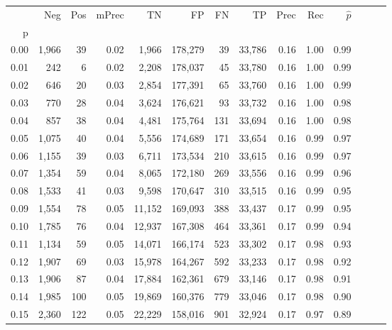 \begin{tabular}{rrrrrrrrrrrrrr}
\toprule
{} &    Neg &  Pos & mPrec &       TN &       FP &      FN &      TP &  Prec &   Rec & $\hat{p}$ \\
p    &        &      &       &          &          &         &         &       &       &           \\
\midrule
0.00 &  1,966 &   39 &  0.02 &    1,966 &  178,279 &      39 &  33,786 &  0.16 &  1.00 &      0.99 \\
0.01 &    242 &    6 &  0.02 &    2,208 &  178,037 &      45 &  33,780 &  0.16 &  1.00 &      0.99 \\
0.02 &    646 &   20 &  0.03 &    2,854 &  177,391 &      65 &  33,760 &  0.16 &  1.00 &      0.99 \\
0.03 &    770 &   28 &  0.04 &    3,624 &  176,621 &      93 &  33,732 &  0.16 &  1.00 &      0.98 \\
0.04 &    857 &   38 &  0.04 &    4,481 &  175,764 &     131 &  33,694 &  0.16 &  1.00 &      0.98 \\
0.05 &  1,075 &   40 &  0.04 &    5,556 &  174,689 &     171 &  33,654 &  0.16 &  0.99 &      0.97 \\
0.06 &  1,155 &   39 &  0.03 &    6,711 &  173,534 &     210 &  33,615 &  0.16 &  0.99 &      0.97 \\
0.07 &  1,354 &   59 &  0.04 &    8,065 &  172,180 &     269 &  33,556 &  0.16 &  0.99 &      0.96 \\
0.08 &  1,533 &   41 &  0.03 &    9,598 &  170,647 &     310 &  33,515 &  0.16 &  0.99 &      0.95 \\
0.09 &  1,554 &   78 &  0.05 &   11,152 &  169,093 &     388 &  33,437 &  0.17 &  0.99 &      0.95 \\
0.10 &  1,785 &   76 &  0.04 &   12,937 &  167,308 &     464 &  33,361 &  0.17 &  0.99 &      0.94 \\
0.11 &  1,134 &   59 &  0.05 &   14,071 &  166,174 &     523 &  33,302 &  0.17 &  0.98 &      0.93 \\
0.12 &  1,907 &   69 &  0.03 &   15,978 &  164,267 &     592 &  33,233 &  0.17 &  0.98 &      0.92 \\
0.13 &  1,906 &   87 &  0.04 &   17,884 &  162,361 &     679 &  33,146 &  0.17 &  0.98 &      0.91 \\
0.14 &  1,985 &  100 &  0.05 &   19,869 &  160,376 &     779 &  33,046 &  0.17 &  0.98 &      0.90 \\
0.15 &  2,360 &  122 &  0.05 &   22,229 &  158,016 &     901 &  32,924 &  0.17 &  0.97 &      0.89 \\

\end{tabular}

